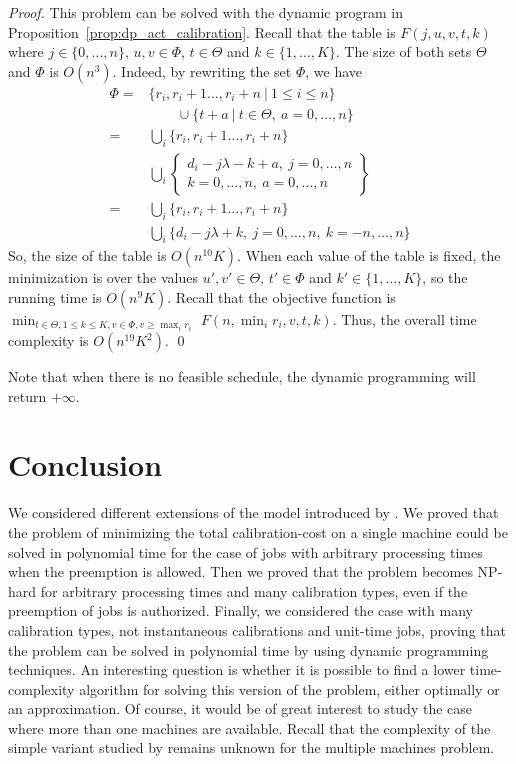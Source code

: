 \begin{proof}
This problem can be solved with the dynamic program in Proposition~\ref{prop:dp_act_calibration}. Recall that the table is $F(j,u,v,t,k)$ where $j\in \{0,\ldots,n\}$, $u,v\in \Phi$, $t\in \Theta$ and $k\in \{1,\ldots,K\}$.
The size of both sets $\Theta$ and $\Phi$ is $O(n^3)$. Indeed, by rewriting the set $\Phi$, we have
\begin{align*}
\Phi =  &\{ r_i, r_i+1\ldots, r_i+n ~|~ 1\leq i\leq n \} \\
&\qquad \cup \{ t+a~|~t\in \Theta,~a=0,\ldots,n \}\\
= &\bigcup_i  \{ r_i, r_i+1\ldots, r_i+n  \} \\
&\bigcup_i \left\{ \begin{array}{c}
d_i-j\lambda-k+a,~j=0,\ldots, n\\
k=0,\ldots,n,~ a=0,\ldots,n
\end{array} \right\}\\
=&\bigcup_i  \{ r_i, r_i+1\ldots, r_i+n  \} \\
&\bigcup_i \{ d_i-j\lambda+k,~j=0,\ldots, n, ~k=-n,\ldots,n\}
\end{align*}
So, the size of the table is $O(n^{10}K)$. When each value of the table is fixed, the minimization is over the values $u', v'\in \Theta$, $t'\in \Phi$ and $k'\in \{1,\ldots,K  \}$, so the running time is $O(n^9K)$. 
Recall that the objective function is 
$\min_{t\in \Theta, 1\leq k \leq K,v\in \Phi, v \geq \max_i r_i } $ $F(n,\min_i r_i,v,t,k)$.
Thus, the overall time complexity is $O(n^{19}K^2)$.
\qed\end{proof}


Note that when there is no feasible schedule, the dynamic programming will return $+\infty$.







\section{Conclusion}
We considered different extensions of the model introduced by 
\cite{bender2013efficient}. We proved that the problem of minimizing the total calibration-cost on a single machine could be solved in polynomial time for the case of jobs with arbitrary processing times when the preemption is allowed. Then we proved that the problem becomes NP-hard for arbitrary processing times and many calibration types, even if the preemption of jobs is authorized. Finally, we considered the case with many calibration types, not instantaneous calibrations and unit-time jobs, proving that the problem can be solved in polynomial time by using dynamic programming techniques. An interesting question is whether it is possible to find a lower time-complexity algorithm for solving this version of the problem, either optimally or an approximation. Of course, it would be of great interest to study the case where more than one machines are available. Recall that the complexity of the simple variant studied by \cite{bender2013efficient} remains unknown for the multiple machines problem.


      



